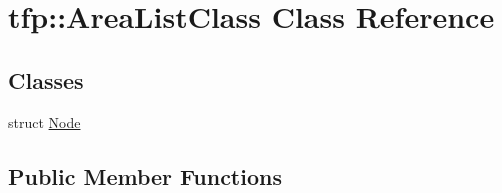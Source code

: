 \hypertarget{classtfp_1_1_area_list_class}{}\section{tfp\+:\+:Area\+List\+Class Class Reference}
\label{classtfp_1_1_area_list_class}
\subsection*{Classes}
\begin{DoxyCompactItemize}
\item 
struct \mbox{\hyperlink{structtfp_1_1_area_list_class_1_1_node}{Node}}
\end{DoxyCompactItemize}
\subsection*{Public Member Functions}
